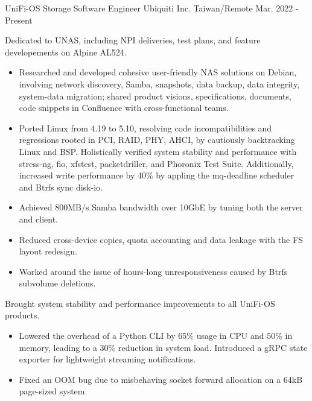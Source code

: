 

\begin{cventries}

  \cventry
    {UniFi-OS Storage Software Engineer} %
    {Ubiquiti Inc.} %
    {Taiwan/Remote} %
    {Mar. 2022 - Present} %
    {
      \begin{cvitems} %
        \item Dedicated to UNAS, including NPI deliveries, test plans, and
          feature developements on Alpine AL524.
        \begin{itemize}
          \item Researched and developed cohesive user-friendly NAS solutions
            on Debian, involving network discovery, Samba, snapshots, data
            backup, data integrity, system-data migration; shared product
            visions, specifications, documents, code snippets in Confluence with
            cross-functional teams.
          \item Ported Linux from 4.19 to 5.10, resolving code incompatibilities
            and regressions rooted in PCI, RAID, PHY, AHCI, by cautiously
            backtracking Linux and BSP. Holistically verified system stability
            and performance with stress-ng, fio, xfstest, packetdriller, and
            Phoronix Test Suite. Additionally, increased write performance by
            40\% by appling the mq-deadline scheduler and Btrfs sync disk-io.
          \item Achieved 800MB/s Samba bandwidth over 10GbE by tuning both the
            server and client.
          \item Reduced cross-device copies, quota accounting and data leakage
            with the FS layout redesign.
          \item Worked around the issue of hours-long unresponsiveness caused
            by Btrfs subvolume deletions.
        \end{itemize}
        \item Brought system stability and performance improvements to all
          UniFi-OS products.
        \begin{itemize}
          \item Lowered the overhead of a Python CLI by 65\% usage in CPU and
            50\% in memory, leading to a 30\% reduction in system load.
            Introduced a gRPC state exporter for lightweight streaming
            notifications.
          \item Fixed an OOM bug due to misbehaving socket forward allocation on
            a 64kB page-sized system.
        \end{itemize}
      \end{cvitems}
    }


\end{cventries}
